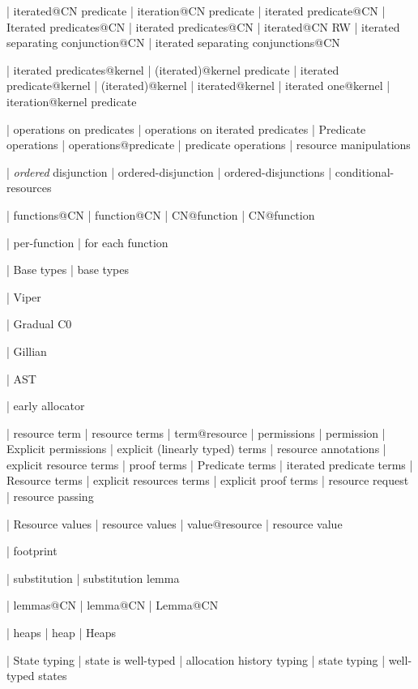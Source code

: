  | iterated@CN predicate
 | iteration@CN predicate
 | iterated predicate@CN
 | Iterated predicates@CN
 | iterated predicates@CN
 | iterated@CN RW
 | iterated separating conjunction@CN
 | iterated separating conjunctions@CN

 | iterated predicates@kernel
 | (iterated)@kernel predicate
 | iterated predicate@kernel
 | (iterated)@kernel
 | iterated@kernel
 | iterated one@kernel
 | iteration@kernel predicate
 
 | operations on predicates
 | operations on iterated predicates
 | Predicate operations
 | operations@predicate
 | predicate operations
 | resource manipulations

 | \emph {ordered} disjunction
 | ordered-disjunction
 | ordered-disjunctions
 | conditional-resources

 | functions@CN
 | function@CN
 | CN@function
 | CN@function

 | per-function
 | for each function

 | Base types
 | base types

 | Viper

 | Gradual C0

 | Gillian

 | AST

 | early allocator

 | resource term
 | resource terms
 | term@resource
 | permissions
 | permission
 | Explicit permissions
 | explicit (linearly typed) terms
 | resource annotations
 | explicit resource terms
 | proof terms
 | Predicate terms
 | iterated predicate terms
 | Resource terms
 | explicit resources terms
 | explicit proof terms
 | resource request
 | resource passing

 | Resource values
 | resource values
 | value@resource
 | resource value

 | footprint

 | substitution
 | substitution lemma

 | lemmas@CN
 | lemma@CN
 | Lemma@CN

 | heaps
 | heap
 | Heaps

 | State typing
 | state is well-typed
 | allocation history typing
 | state typing
 | well-typed states

